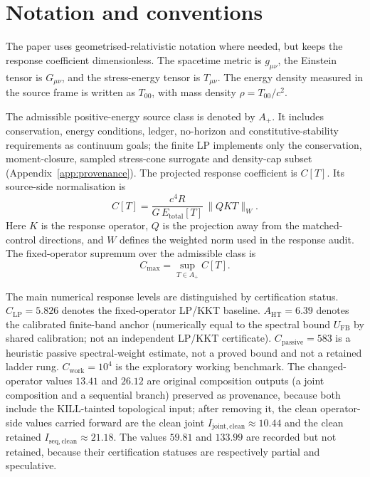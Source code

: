 \documentclass[11pt,a4paper]{article}
\begin{document}
\appendix

\section{Notation and conventions}\label{app:notation}

The paper uses geometrised-relativistic notation where needed, but keeps the response coefficient dimensionless. The spacetime metric is $g_{\mu\nu}$, the Einstein tensor is $G_{\mu\nu}$, and the stress-energy tensor is $T_{\mu\nu}$. The energy density measured in the source frame is written as $T_{00}$, with mass density $\rho=T_{00}/c^{2}$.

The admissible positive-energy source class is denoted by $A_{+}$. It includes conservation, energy conditions, ledger, no-horizon and constitutive-stability requirements as continuum goals; the finite LP implements only the conservation, moment-closure, sampled stress-cone surrogate and density-cap subset (Appendix~\ref{app:provenance}). The projected response coefficient is $C[T]$. Its source-side normalisation is
\[
C[T] = \frac{c^{4}R}{G\,E_{\mathrm{total}}[T]}\,\bigl\| Q K T \bigr\|_{W}.
\]
Here $K$ is the response operator, $Q$ is the projection away from the matched-control directions, and $W$ defines the weighted norm used in the response audit. The fixed-operator supremum over the admissible class is
\[
C_{\mathrm{max}} = \sup_{T\in A_{+}}C[T].
\]

The main numerical response levels are distinguished by certification status. $C_{\mathrm{LP}}=5.826$ denotes the fixed-operator LP/KKT baseline. $A_{\mathrm{HT}}=6.39$ denotes the calibrated finite-band anchor (numerically equal to the spectral bound $U_{\mathrm{FB}}$ by shared calibration; not an independent LP/KKT certificate). $C_{\mathrm{passive}}=583$ is a heuristic passive spectral-weight estimate, not a proved bound and not a retained ladder rung. $C_{\mathrm{work}}=10^{4}$ is the exploratory working benchmark. The changed-operator values $13.41$ and $26.12$ are original composition outputs (a joint composition and a sequential branch) preserved as provenance, because both include the KILL-tainted topological input; after removing it, the clean operator-side values carried forward are the clean joint $I_{\mathrm{joint,clean}}\approx10.44$ and the clean retained $I_{\mathrm{seq,clean}}\approx21.18$. The values $59.81$ and $133.99$ are recorded but not retained, because their certification statuses are respectively partial and speculative.
\end{document}
